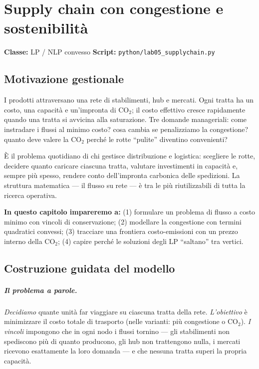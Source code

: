 \chapter{Supply chain con congestione e sostenibilità}
\label{cap:supplychain}

\noindent\textbf{Classe:} LP / NLP convesso \hfill
\textbf{Script:} \texttt{python/lab05\_supplychain.py}

\section{Motivazione gestionale}

I prodotti attraversano una rete di stabilimenti, hub e mercati. Ogni tratta ha un
costo, una capacità e un'impronta di CO$_2$; il costo effettivo cresce rapidamente
quando una tratta si avvicina alla saturazione. Tre domande manageriali:
come instradare i flussi al minimo costo? cosa cambia se penalizziamo la congestione?
quanto deve valere la CO$_2$ perché le rotte ``pulite'' diventino convenienti?



È il problema quotidiano di chi gestisce distribuzione e logistica: scegliere le
rotte, decidere quanto caricare ciascuna tratta, valutare investimenti in capacità
e, sempre più spesso, rendere conto dell'impronta carbonica delle spedizioni. La
struttura matematica --- il flusso su rete --- è tra le più riutilizzabili di tutta
la ricerca operativa.

\textbf{In questo capitolo impareremo a:} (1) formulare un problema di flusso a
costo minimo con vincoli di conservazione; (2) modellare la congestione con termini
quadratici convessi; (3) tracciare una frontiera costo-emissioni con un prezzo
interno della CO$_2$; (4) capire perché le soluzioni degli LP ``saltano'' tra
vertici.

\section{Costruzione guidata del modello}

\paragraph{Il problema a parole.} \emph{Decidiamo} quante unità far viaggiare su
ciascuna tratta della rete. \emph{L'obiettivo} è minimizzare il costo totale di
trasporto (nelle varianti: più congestione o CO$_2$). \emph{I vincoli} impongono che
in ogni nodo i flussi tornino --- gli stabilimenti non spediscono più di quanto
producono, gli hub non trattengono nulla, i mercati ricevono esattamente la loro
domanda --- e che nessuna tratta superi la propria capacità.

